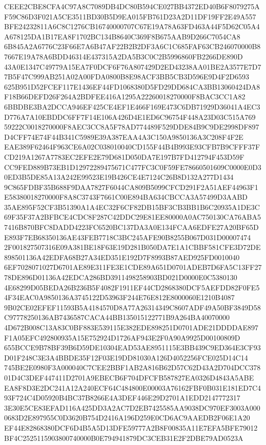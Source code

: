 \documentclass[UTF8,fontset=fandol,zihao=-4,a4paper]{ctexart}
\begin{document}
{{CEEE2CBE8CFA4C97A8C7089DB4DC80B594CE027BB4372ED40B6F8079275AF59C86D3F021A5CE3511BD30B5D9EA015FB761D23A2D11DF19FF2E49A557
BFE24232811A6C8C1276CB16740000707C67E19A78A63FD463A44F5D62C05A4A678125DA1B17EA8F1702BC134B8640C369F8B675AAB9D266C7054CA8
6B845A2A6776C23F66E7A6B47AF22B2B2DF3A6C1C685FAF63CB246070000B87667E19A78A6BDD46314E437315A2DA5B3C0C2B5996860FB2266DE890D
43A0E1347C49779A15EA7F0DCF6F76A807429D2ED43238AA01BE2A3577E7D77B5F47C999AB251A02A00FDA0800B8E98ACF3BB5CB3D596E9D4F2D6593
625B951D52FCEF117E1436EF44FD1068380D5FD29DD684CA3BB13060424DA8F18B66DEFD26F264A2BDFEE416A1295A22260018270000F8BAC3CC1A82
6BBDBE3BA2DCCA946EF425CE4EF1E466F169E473C6DB71929D36041A4EC3D776A7A10EBDDC6FF7F14E106A426D4E1ED6C96754F448A23D03C515A769
59222C0018270000F8AEC3CC8A5F78AD774489F529DDE84B9C9DE2998DF897D4CFF74E74F44B341C5989E39A387EAA4A3C150A9850136A3C208F4F2E
EAE389F62464F963CE6A02C038010040CD155F44B4B993E93CFB7B9CFFF37FCD219A1267A7783EC2EFE2E79D681D050DA7E197B7FD412794F453D59F
CC9FED889B73EB1D12972289475671C477FC3C0F59FE78660501609C0000E0D30ED3B5DE85A13A242E99523E19B426CE4E7124C26B8D132A277D1434
9C865FDBF35B688F9DAA7827F6044CA809B5099CFCD291F2A51AEF44963F1E58380018270000F8A8C3743F7661C00E894BA634CBCCA3A57499D3AABD
35AE895F52CF3B51390A1A4EC32F6CF82DB15BF3CB3BB1B6C20935A1DE3C69F35F37A2BFBCE4CDC8F287C42DDC29E81EE80000A0AC750130CA76ABA5
7416B870BFC8DADD4223FC6520BC137DA3A0E134FCAA6EDFE27A20BF65DE893F7EB68350136AE43FEB7718C3BC245AFE90B8255B067D031D00007474
2F001827507316E09A381BE18F63E19D281B050DA7E1A1CBBF581CFE3D72DE898501136A42EDFA68B27A34ED351E192D7F8993B87AED925FD0010040
6EF7028071027D6701AE89E311FE3E1CDE89A651D0701ADEB7D6FA5C13FF2778DE896D01136A42EDCA286BD3911498258903BD021D0000E0C5380130
4E68299D05BEDA26B236B5F4082F1911EF44CD2868380DCF5AEFDD82F0FE54F34EAC0A9850136A3745122D53963F244E76E812E8000060E1210B4087
9B02CE02EFEF11593B5A4184570D8A77A26314349C8607ADF49A50BF3849D58C97778250136AB7436587CACA44BB135015122771B9A264BA40070000
4D672B008C13A83C0BF883E539115E382EDE898251D0701ADE21DDDDAE897F1A05EFC492800935A15E752924D1726AF943E2F0A90A9925D00100809D
655BCCE9B78BF39B6D59DE10304EAD53AE8951115E3BB439C9ED364E3CF93D01F248C3E3A4BBDE35F12F03E19DD81030A126D4052256FCE025D14C14
745BE2E0980F3A000040C7CEE2BBF1AB2A816B62D57C62D43A2D704DCC37801D4C3DEF447411D2701A9EBECB6F704DFCFB587827EA0326D4843A5ABE
EA8F8D3E2DC241A12A240ECF64C484800E00003A76162FBF0B031E181ED7C493F724C4D05920B4BC37B8266E4A3DEF446E29D2701A1EDD2147772317
3E30E5CE83EFAD116A425DD3A2AC7D2EB7425585AA9038DC970EF3003A0000683D2E897955C0D3620B754D2416A196D259E0CD6AC9AAEDB2F06E1A20
EF44E82868380DCF6D4B5A5D13DFE59777A2B8F00835A11E7EFA5BFE79012BF4C2525115903800740000B0E794941879DC3CEB31E2F2DBE79AD0523A
}}
\end{document}
